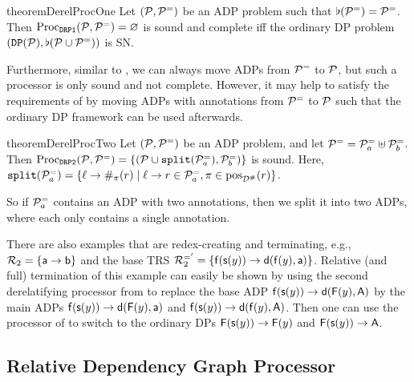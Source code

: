 \begin{restatable}{theorem}{DerelProcOne}\label{theorem:derel-proc-1}
     Let $(\mathcal{P}, \mathcal{P}^{=})$ be an ADP problem such that $\flat(\mathcal{P}^{=}) = \mathcal{P}^{=}$.    
     Then $\operatorname{Proc}_{\mathtt{DRP1}}(\mathcal{P}, \mathcal{P}^{=}) = \varnothing$ is sound and complete
     iff the ordinary DP problem
     $(\mathtt{DP}(\mathcal{P}), \flat(\mathcal{P} \cup \mathcal{P}^{=}))$ \pagebreak[2] is SN.
\end{restatable}

Furthermore,  similar to ,
we can always move ADPs from $\mathcal{P}^{=}$ to $\mathcal{P}$,
but such a processor is only sound and not complete.
However, it may help to satisfy 
the requirements of  by moving ADPs with 
annotations from $\mathcal{P}^{=}$ to $\mathcal{P}$ such that
the ordinary DP framework can be used  afterwards.

\begin{restatable}{theorem}{DerelProcTwo}\label{theorem:derel-proc-2}
    Let $(\mathcal{P}, \mathcal{P}^{=})$ be an ADP problem, and let $\mathcal{P}^{=} = \mathcal{P}^{=}_{a} \uplus \mathcal{P}^{=}_{b}$.
    Then $\operatorname{Proc}_{\mathtt{DRP2}}(\mathcal{P}, \mathcal{P}^{=}) = \{(\mathcal{P} \cup \mathtt{split}(\mathcal{P}^{=}_{a}),
    \mathcal{P}^{=}_{b})\}$ is sound.
    Here, $\mathtt{split}(\mathcal{P}^{=}_{a}) = \{\ell \to \#_{\pi}(r) \mid \ell \to r \in \mathcal{P}^{=}_{a}, \pi \in \mathrm{pos}_{\mathcal{D}^\#}(r)\}$.    
\end{restatable}
\noindent
So if $\mathcal{P}^{=}_{a}$ contains an ADP with two annotations, then we split it into two
ADPs, where each only contains
 a single annotation.

\begin{example}\label{terminatingRedexDuplCreate}
    There are also examples that are redex-creating and terminating, e.g., $\mathcal{R}_2 = \{ \mathsf{a} \to \mathsf{b} \}$ 
    and the base TRS $\mathcal{R}_2^{='} =
    \{ \mathsf{f}(\mathsf{s}(y)) \to \mathsf{d}(\mathsf{f}(y),\mathsf{a}) \}$.
    Relative (and full) termination of this example can easily be
    shown by using
 the second derelatifying processor from  to
    replace the base ADP
    $\mathsf{f}(\mathsf{s}(y)) \to \mathsf{d}(\mathsf{F}(y),\mathsf{A})$ by the main ADPs $\mathsf{f}(\mathsf{s}(y)) \to \mathsf{d}(\mathsf{F}(y),\mathsf{a})$ and
    $\mathsf{f}(\mathsf{s}(y)) \to \mathsf{d}(\mathsf{f}(y),\mathsf{A})$. Then one can use the processor of
     to switch to the ordinary DPs
$\mathsf{F}(\mathsf{s}(y)) \to \mathsf{F}(y)$ and $\mathsf{F}(\mathsf{s}(y)) \to \mathsf{A}$.
 \end{example}
  
\subsection{Relative Dependency Graph Processor}\label{Relative Dependency Graph Processor}

